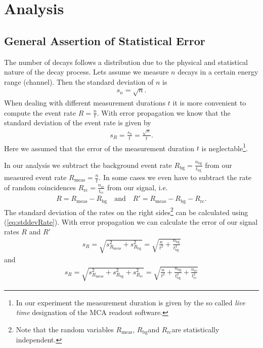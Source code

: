
\section{Analysis}
\subsection{General Assertion of Statistical Error}
The number of decays follows a  distribution due to the
physical and statistical nature of the decay process. Lets assume we measure
$n$ decays in a certain energy range (channel). Then the standard
deviation \cite{cowan} of $n$ is
\begin{align}
  s_n = \sqrt{n}. \label{eq:stddevCounts}
\end{align}
When dealing with different measurement durations $t$ it is more convenient to
compute the event rate $R = \frac{n}{t}$. With  error
propagation \cite{cowan} we know that the standard deviation of the event
rate is given by
\begin{align}
  s_R = \frac{s_n}{t} = \frac{\sqrt{n}}{t}. \label{eq:stddevRate}
\end{align}
Here we assumed that the error of the measurement duration $t$ is
neglectable\footnote{In our experiment the measurement duration is given by
the so called \emph{live time} designation of the MCA readout software.}.

\newcommand{\Rmeas}{\ensuremath{R_{\mathrm{meas}}}}
\newcommand{\Rbg}{\ensuremath{R_{\mathrm{bg}}}}
\newcommand{\Rrc}{\ensuremath{R_{\mathrm{rc}}}}

In our analysis we subtract the background event rate $\Rbg =
\frac{n_{\mathrm{bg}}}{t_{\mathrm{bg}}}$ from our measured event rate
$\Rmeas = \frac{n}{t}$. In some cases we even have to subtract the rate of
random coincidences $\Rrc = \frac{n_{\mathrm{rc}}}{t_{\mathrm{rc}}}$ from
our signal, i.e. 
\begin{align}
  R = \Rmeas - \Rbg \quad \textrm{and} \quad R' = \Rmeas - \Rbg - \Rrc.
\end{align}
The standard deviation of the rates on the right sides\footnote{Note that the
random variables \Rmeas, \Rbg  and \Rrc  are statistically independent.} can
be calculated using (\ref{eq:stddevRate}). With  error
propagation we can calculate the error of our signal rates $R$ and
$R'$
\begin{align}
  s_R = \sqrt{s_{\Rmeas}^2 + s_{\Rbg}^2} = \sqrt{\frac{n}{t^2} + \frac{n_{\mathrm{bg}}}{t_{\mathrm{bg}}^2}}
  \label{eq:stddevBack}
\end{align}
and
\begin{align}
  s_R = \sqrt{s_{\Rmeas}^2 + s_{\Rbg}^2 + s_{\Rrc}^2} 
      = \sqrt{\frac{n}{t^2} + \frac{n_{\mathrm{bg}}}{t_{\mathrm{bg}}^2} +
      \frac{n_{\mathrm{rc}}}{t_{\mathrm{rc}}^2}}
  \label{eq:stddevRC}
\end{align}


